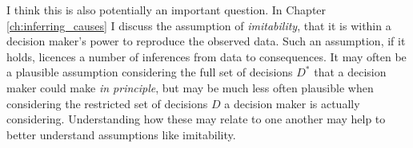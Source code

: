I think this is also potentially an important question. In Chapter \ref{ch:inferring_causes} I discuss the assumption of \emph{imitability}, that it is within a decision maker's power to reproduce the observed data. Such an assumption, if it holds, licences a number of inferences from data to consequences. It may often be a plausible assumption considering the full set of decisions $D^*$ that a decision maker could make \emph{in principle}, but may be much less often plausible when considering the restricted set of decisions $D$ a decision maker is actually considering. Understanding how these may relate to one another may help to better understand assumptions like imitability.
